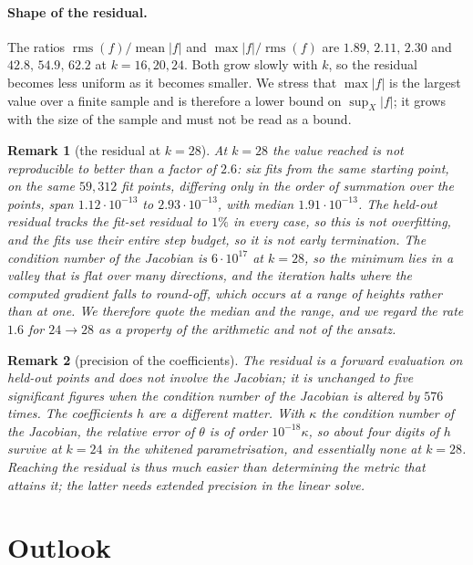 \documentclass[11pt,a4paper]{article}
\newtheorem{remark}{Remark}
\newcommand{\rms}{\operatorname{rms}}
\begin{document}
\paragraph{Shape of the residual.}
The ratios $\rms(f)/\operatorname{mean}|f|$ and $\max|f|/\rms(f)$ are
$1.89,\,2.11,\,2.30$ and $42.8,\,54.9,\,62.2$ at $k=16,20,24$. Both grow slowly
with $k$, so the residual becomes less uniform as it becomes smaller.
We stress that $\max|f|$ is the largest value over a finite sample and is
therefore a lower bound on $\sup_X|f|$; it grows with the size of the sample and
must not be read as a bound.

\begin{remark}[the residual at $k=28$]
\label{rem:k28}
At $k=28$ the value reached is not reproducible to better than a factor of
$2.6$: six fits from the same starting point, on the same $59{,}312$ fit points,
differing only in the order of summation over the points, span
$1.12\cdot10^{-13}$ to $2.93\cdot10^{-13}$, with median $1.91\cdot10^{-13}$. The
held-out residual tracks the fit-set residual to $1\%$ in every case, so this is
not overfitting, and the fits use their entire step budget, so it is not early
termination. The condition number of the Jacobian is $6\cdot10^{17}$ at $k=28$,
so the minimum lies in a valley that is flat over many directions, and the
iteration halts where the computed gradient falls to round-off, which occurs at a
range of heights rather than at one. We therefore quote the median and the range,
and we regard the rate $1.6$ for $24\to28$ as a property of the arithmetic and
not of the ansatz.
\end{remark}

\begin{remark}[precision of the coefficients]
The residual is a forward evaluation on held-out points and does not involve the
Jacobian; it is unchanged to five significant figures when the condition number
of the Jacobian is altered by $576$ times. The coefficients $h$ are a different
matter. With $\kappa$ the condition number of the Jacobian, the relative error of
$\theta$ is of order $10^{-18}\kappa$, so about four digits of $h$ survive at
$k=24$ in the whitened parametrisation, and essentially none at $k=28$. Reaching
the residual is thus much easier than determining the metric that attains it;
the latter needs extended precision in the linear solve.
\end{remark}

\section{Outlook}
\end{document}
